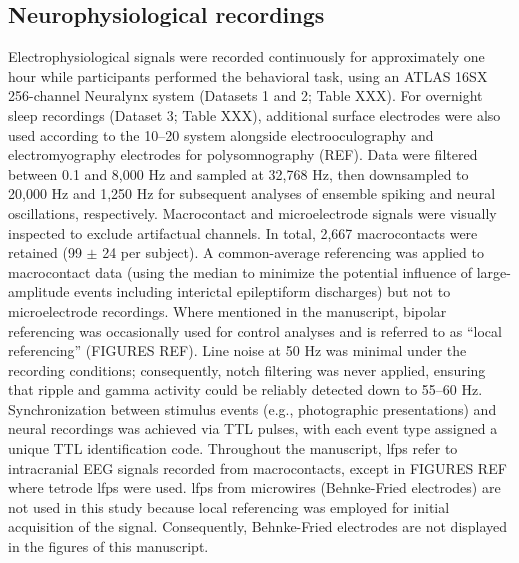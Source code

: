 \documentclass[12pt,a4paper]{report}
\newcommand{\gp}[1]{\glspl{#1}}  %
\newcommand{\Gp}[1]{\Glspl{#1}}  %
\begin{document}
\subsection{Neurophysiological recordings}
Electrophysiological signals were recorded continuously for approximately one hour while participants performed the behavioral task, using an ATLAS 16SX 256-channel Neuralynx system (Datasets 1 and 2; Table XXX). For overnight sleep recordings (Dataset 3; Table XXX), additional surface electrodes were also used according to the 10–20 system alongside electrooculography and electromyography electrodes for polysomnography (REF). Data were filtered between 0.1 and 8,000 Hz and sampled at 32,768 Hz, then downsampled to 20,000 Hz and 1,250 Hz for subsequent analyses of ensemble spiking and neural oscillations, respectively. Macrocontact and microelectrode signals were visually inspected to exclude artifactual channels. In total, 2,667 macrocontacts were retained (99 $\pm$ 24 per subject). A common-average referencing was applied to macrocontact data (using the median to minimize the potential influence of large-amplitude events including interictal epileptiform discharges) but not to microelectrode recordings. Where mentioned in the manuscript, bipolar referencing was occasionally used for control analyses and is referred to as “local referencing” (FIGURES REF). Line noise at 50 Hz was minimal under the recording conditions; consequently, notch filtering was never applied, ensuring that ripple and gamma activity could be reliably detected down to 55–60 Hz. Synchronization between stimulus events (e.g., photographic presentations) and neural recordings was achieved via TTL pulses, with each event type assigned a unique TTL identification code. Throughout the manuscript, \gp{lfp} refer to intracranial EEG signals recorded from macrocontacts, except in FIGURES REF where tetrode \gp{lfp} were used. \Gp{lfp} from microwires (Behnke-Fried electrodes) are not used in this study because local referencing was employed for initial acquisition of the signal. Consequently, Behnke-Fried electrodes are not displayed in the figures of this manuscript. 
\end{document}
